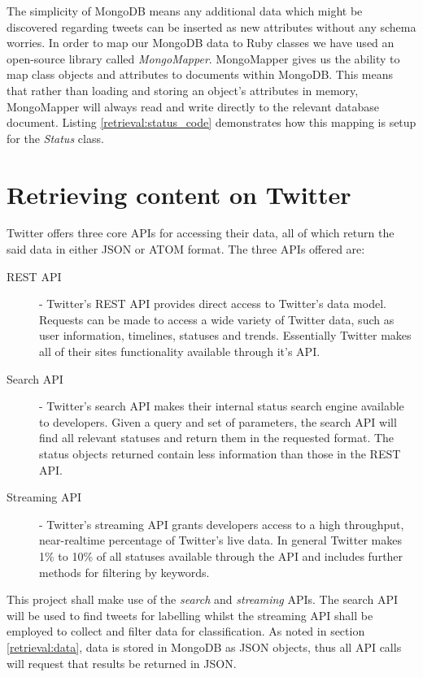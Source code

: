 The simplicity of MongoDB means any additional data which might be discovered regarding tweets can be inserted as new attributes without any schema worries. In order to map our MongoDB data to Ruby classes we have used an open-source library called \emph{MongoMapper}. MongoMapper gives us the ability to map class objects and attributes to documents within MongoDB. This means that rather than loading and storing an object's attributes in memory, MongoMapper will always read and write directly to the relevant database document. Listing \ref{retrieval:status_code} demonstrates how this mapping is setup for the \emph{Status} class.

\section{Retrieving content on Twitter}

Twitter offers three core APIs for accessing their data, all of which return the said data in either JSON or ATOM format. The three APIs offered are:

\begin{description}
	\item [REST API] - Twitter's REST API provides direct access to Twitter's data model. Requests can be made to access a wide variety of Twitter data, such as user information, timelines, statuses and trends. Essentially Twitter makes all of their sites functionality available through it's API.
	\item [Search API] - Twitter's search API makes their internal status search engine available to developers. Given a query and set of parameters, the search API will find all relevant statuses and return them in the requested format. The status objects returned contain less information than those in the REST API.
	\item [Streaming API] - Twitter's streaming API grants developers access to a high throughput, near-realtime percentage of Twitter's live data. In general Twitter makes 1\% to 10\% of all statuses available through the API and includes further methods for filtering by keywords.
\end{description}

This project shall make use of the \emph{search} and \emph{streaming} APIs. The search API will be used to find tweets for labelling whilst the streaming API shall be employed to collect and filter data for classification. As noted in section \ref{retrieval:data}, data is stored in MongoDB as JSON objects, thus all API calls will request that results be returned in JSON.


